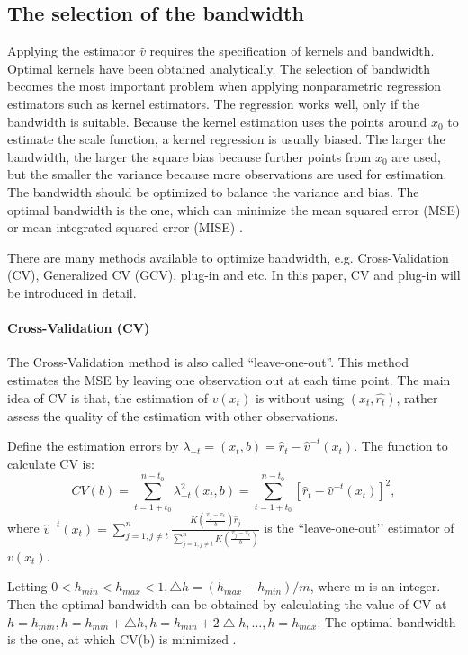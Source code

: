 \subsection{The selection of the bandwidth}
Applying the estimator $\hat{v}$  requires the specification of kernels and bandwidth. Optimal kernels have been obtained analytically. The selection of bandwidth becomes the most important problem when applying nonparametric regression estimators such as kernel estimators. The regression works well, only if the bandwidth is suitable. Because the kernel estimation uses the points around $x_{0}$  to estimate the scale function, a kernel regression is usually biased. The larger the bandwidth, the larger the square bias because further points from $x_{0}$ are used, but the smaller the variance because more observations are used for estimation. The bandwidth should be optimized to balance the variance and bias. The optimal bandwidth is the one, which can minimize the mean squared error (MSE) or mean integrated squared error (MISE) \citep{Gasser1991}. 

There are many methods available to optimize bandwidth, e.g. Cross-Validation (CV), Generalized CV (GCV), plug-in and etc. In this paper, CV and plug-in will be introduced in detail.

\paragraph{Cross-Validation (CV)}

The Cross-Validation method is also called “leave-one-out”.  This method estimates the MSE by leaving one observation out at each time point. The main idea of CV is that, the estimation of $v(x_{t})$ is without using $(x_{t},\hat{r_{t}})$, rather assess the quality of the estimation with other observations. 

Define the estimation errors by $\lambda_{-t}=(x_{t},b)=\hat{r}_{t}-\hat{v}^{-t}(x_{t})$. The function to calculate CV is:
\begin{equation}
CV(b) = \sum_{t=1+t_{0}}^{n-t_{0}}\lambda_{-t}^{2}(x_{t},b)=\sum_{t=1+t_{0}}^{n-t_{0}}[\hat{r}_{t}-\hat{v}^{-t}(x_{t})]^{2},
\end{equation}
where $\hat{v}^{-t}(x_t)=\sum_{j=1,j\neq t}^{n}\frac{K(\frac{x_{j}-x_{t}}{b})\hat{r}_{j}}{\sum_{j=1,j \neq t}^{n}K(\frac{x_{j}-x_{t}}{b})}$ is the “leave-one-out’’ estimator of $v(x_{t})$.

Letting $0<h_{min}<h_{max}<1, \bigtriangleup h=(h_{max}-h_{min})/m$, where m is an integer. Then the optimal bandwidth can be obtained by calculating the value of CV at $h=h_{min}, h=h_{min} + \bigtriangleup h, h=h_{min} + 2\bigtriangleup h, \ldots, h=h_{max}$. The optimal bandwidth is the one, at which CV(b) is minimized \citep{Sarda1993}.

